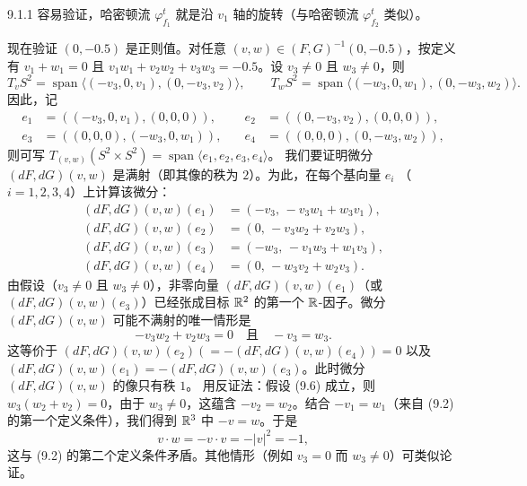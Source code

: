 \begin{wrem}{9.1.1}
  容易验证，哈密顿流 $\varphi^t_{f_1}$ 就是沿 $v_1$ 轴的旋转（与哈密顿流
  $\varphi^t_{f_2}$ 类似）。
\end{wrem}

现在验证 $(0,-0.5)$ 是正则值。对任意 $(v,w)\in(F,G)^{-1}(0,-0.5)$，按定义有
$v_1+w_1=0$ 且 $v_1w_1+v_2w_2+v_3w_3=-0.5$。设 $v_3\neq0$ 且 $w_3\neq0$，则
\begin{equation*}
  T_vS^2=\operatorname{span}\langle(-v_3,0,v_1),(0,-v_3,v_2)\rangle,\qquad
  T_wS^2=\operatorname{span}\langle(-w_3,0,w_1),(0,-w_3,w_2)\rangle.
\end{equation*}
因此，记
\begin{equation*}
\begin{aligned}
  e_1&=((-v_3,0,v_1),(0,0,0)),&\quad
  e_2&=((0,-v_3,v_2),(0,0,0)),\\
  e_3&=((0,0,0),(-w_3,0,w_1)),&\quad
  e_4&=((0,0,0),(0,-w_3,w_2)),
\end{aligned}
\end{equation*}
则可写 $T_{(v,w)}(S^2\times S^2)=\operatorname{span}\langle e_1,e_2,e_3,e_4\rangle$。
我们要证明微分 $(dF,dG)(v,w)$ 是满射（即其像的秩为 $2$）。为此，在每个基向量 $e_i$
（$i=1,2,3,4$）上计算该微分：
\begin{equation*}
\begin{aligned}
  (dF,dG)(v,w)(e_1)&=(-v_3,\,-v_3w_1+w_3v_1),\\
  (dF,dG)(v,w)(e_2)&=(0,\,-v_3w_2+v_2w_3),\\
  (dF,dG)(v,w)(e_3)&=(-w_3,\,-v_1w_3+w_1v_3),\\
  (dF,dG)(v,w)(e_4)&=(0,\,-w_3v_2+w_2v_3).
\end{aligned}
\end{equation*}
由假设（$v_3\neq0$ 且 $w_3\neq0$），非零向量 $(dF,dG)(v,w)(e_1)$（或
$(dF,dG)(v,w)(e_3)$）已经张成目标 $\mathbb{R}^2$ 的第一个 $\mathbb{R}$-因子。微分
$(dF,dG)(v,w)$ 可能不满射的唯一情形是
\begin{equation}\tag{9.6}
  -v_3w_2+v_2w_3=0\quad\text{且}\quad -v_3=w_3.
\end{equation}
这等价于 $(dF,dG)(v,w)(e_2)(=-(dF,dG)(v,w)(e_4))=0$ 以及
$(dF,dG)(v,w)(e_1)=-(dF,dG)(v,w)(e_3)$。此时微分 $(dF,dG)(v,w)$ 的像只有秩 $1$。
用反证法：假设 (9.6) 成立，则 $w_3(w_2+v_2)=0$，由于 $w_3\neq0$，这蕴含
$-v_2=w_2$。结合 $-v_1=w_1$（来自 (9.2) 的第一个定义条件），我们得到 $\mathbb{R}^3$ 中
$-v=w$。于是
\begin{equation*}
  v\cdot w=-v\cdot v=-|v|^2=-1,
\end{equation*}
这与 (9.2) 的第二个定义条件矛盾。其他情形（例如 $v_3=0$ 而 $w_3\neq0$）可类似论证。

